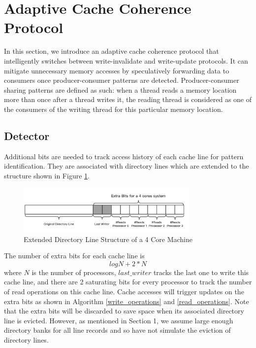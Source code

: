 \documentclass[11pt,conference]{IEEEtran}
\begin{document}
\section{Adaptive Cache Coherence Protocol}
In this section, we introduce an adaptive cache coherence protocol that intelligently switches between write-invalidate and write-update protocols. It can mitigate unnecessary memory accesses by speculatively forwarding data to consumers once producer-consumer patterns are detected. Producer-consumer sharing patterns are defined as such: when a thread reads a memory location more than once after a thread writes it, the reading thread is considered as one of the consumers of the writing thread for this particular memory location.


\subsection{Detector}

Additional bits are needed to track access history of each cache line for pattern identification. They are associated with directory lines which are extended to the structure shown in Figure \ref{dir_line}.

\begin{figure}[!h]
\centering
\captionsetup{justification=centering}
\includegraphics[width=3.5in]{dir_line.png}
\caption{Extended Directory Line Structure of a 4 Core Machine}
\label{dir_line}
\end{figure}
\FloatBarrier

The number of extra bits for each cache line is
\begin{equation*}
log N + 2 * N
\end{equation*}
where $N$ is the number of processors, $last\_writer$ tracks the last one to write this cache line, and there are 2 saturating bits for every processor to track the number of read operations on this cache line. Cache accesses will trigger updates on the extra bits as shown in Algorithm \ref{write_operations} and \ref{read_operations}. Note that the extra bits will be discarded to save space when its associated directory line is evicted. However, as mentioned in Section 1, we assume large enough directory banks for all line records and so have not simulate the eviction of directory lines.
\end{document}
